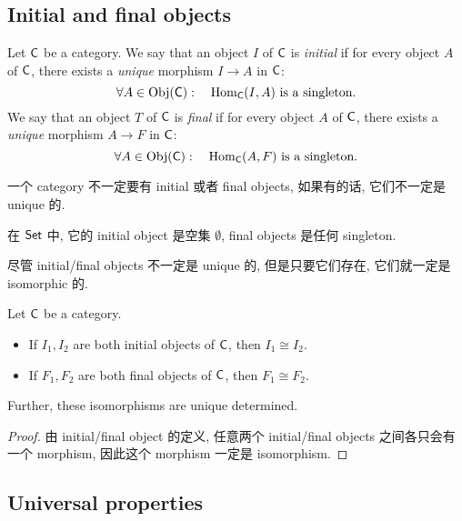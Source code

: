 \subsection{Initial and final objects}\label{sec:1.5.1}

\begin{definition}\label{def:initial_final_objects}
    Let \(\operatorname{\mathsf{C}}\) be a category. We say that an object \(I\) of \(\operatorname{\mathsf{C}}\) is \emph{initial} if for every object \(A\) of \(\operatorname{\mathsf{C}}\), there exists a \emph{unique} morphism \(I \to A\) in \(\operatorname{\mathsf{C}}\):
    \[
        \forall A \in \operatorname{Obj}(\operatorname{\mathsf{C}}): \quad \operatorname{Hom}_{\operatorname{\mathsf{C}}}(I, A) \text{ is a singleton.}
    \]
    We say that an object \(T\) of \(\operatorname{\mathsf{C}}\) is \emph{final} if for every object \(A\) of \(\operatorname{\mathsf{C}}\), there exists a \emph{unique} morphism \(A \to F\) in \(\operatorname{\mathsf{C}}\):
    \[
        \forall A \in \operatorname{Obj}(\operatorname{\mathsf{C}}): \quad \operatorname{Hom}_{\operatorname{\mathsf{C}}}(A, F) \text{ is a singleton.}
    \]

    \begin{note}
        一个 category 不一定要有 initial 或者 final objects, 如果有的话, 它们不一定是 unique 的.
    \end{note}
\end{definition}

\begin{eg}[Set]\label{eg:1.5.3}
    在 \(\operatorname{\mathsf{Set}}\) 中, 它的 initial object 是空集 \(\emptyset\), final objects 是任何 singleton.
\end{eg}

尽管 initial/final objects 不一定是 unique 的, 但是只要它们存在, 它们就一定是 isomorphic 的.

\begin{proposition}\label{prop:1.5.4}
    Let \(\operatorname{\mathsf{C}}\) be a category.
    \begin{itemize}
        \item If \(I_1, I_2\) are both initial objects of \(\operatorname{\mathsf{C}}\), then \(I_1 \cong I_2\).
        \item If \(F_1, F_2\) are both final objects of \(\operatorname{\mathsf{C}}\), then \(F_1 \cong F_2\).
    \end{itemize}
    Further, these isomorphisms are unique determined.
\end{proposition}
\begin{proof}
    由 initial/final object 的定义, 任意两个 initial/final objects 之间各只会有一个 morphism, 因此这个 morphism 一定是 isomorphism.
\end{proof}

\subsection{Universal properties}\label{sec:1.5.2}

